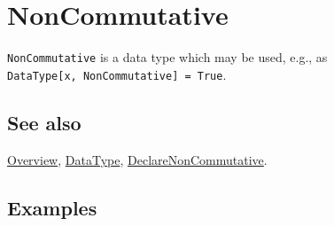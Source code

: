 \documentclass[../FeynCalcManual.tex]{subfiles}
\begin{document}
\hypertarget{noncommutative}{%
\section{NonCommutative}\label{noncommutative}}

\texttt{NonCommutative} is a data type which may be used, e.g., as
\texttt{DataType[\allowbreak{}x,\ \allowbreak{}NonCommutative] = True}.

\subsection{See also}

\hyperlink{toc}{Overview}, \hyperlink{datatype}{DataType},
\hyperlink{declarenoncommutative}{DeclareNonCommutative}.

\subsection{Examples}
\end{document}
